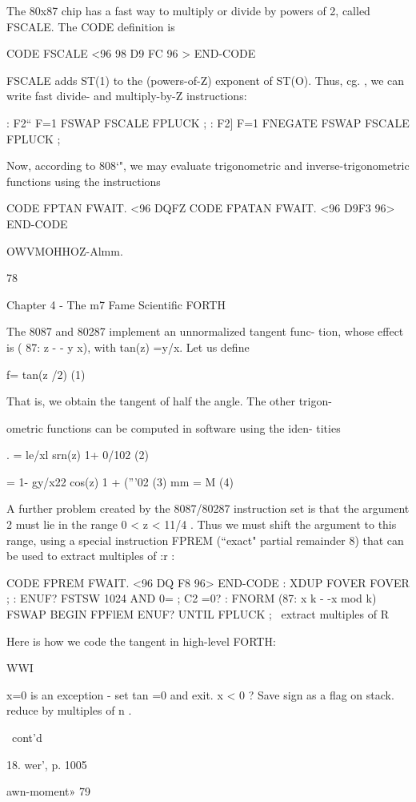 The 80x87 chip has a fast way to multiply or divide by powers of
2, called FSCALE. The CODE deﬁnition is

CODE FSCALE <96 98 D9 FC 96 > END-CODE

FSCALE adds ST(1) to the (powers-of-Z) exponent of ST(O).
Thus, cg. , we can write fast divide- and multiply-by-Z instructions:

: F2“ F=1 FSWAP FSCALE FPLUCK ;
: F2] F=1 FNEGATE FSWAP FSCALE FPLUCK ;

Now, according to 808‘", we may evaluate trigonometric and
inverse-trigonometric functions using the instructions

CODE FPTAN FWAIT. <96 DQFZ %
CODE FPATAN FWAIT. <96 D9F3 96> END-CODE

OWVMOHHOZ-Almm.

78

Chapter 4 - The m7 Fame Scientiﬁc FORTH

The 8087 and 80287 implement an unnormalized tangent func-
tion, whose effect is ( 87: z - - y x), with tan(z) =y/x. Let us deﬁne

f= tan(z /2) (1)

That is, we obtain the tangent of half the angle. The other trigon-

ometric functions can be computed in software using the iden-
tities

. = le/xl
srn(z) 1+ 0/102 (2)

= 1- gy/x22
cos(z) 1 + (”’02 (3)
mm = M (4)

A further problem created by the 8087/80287 instruction set is
that the argument 2 must lie in the range 0 < z < 11/4 . Thus we
must shift the argument to this range, using a special instruction
FPREM (“exact" partial remainder 8) that can be used to extract
multiples of :r :

CODE FPREM FWAIT. <96 DQ F8 96> END-CODE
: XDUP FOVER FOVER ;
: ENUF? FSTSW 1024 AND 0= ; \bit C2 =0?
: FNORM (87: x k - -x mod k) FSWAP
BEGIN FPFlEM ENUF? UNTIL FPLUCK ;
\ extract multiples of R

Here is how we code the tangent in high-level FORTH:

WWI

x=0 is an exception - set tan =0 and exit.
x < 0 ? Save sign as a ﬂag on stack.
reduce by multiples of n .

\ cont'd

 

18. wer', p. 1005

awn-moment» 79

